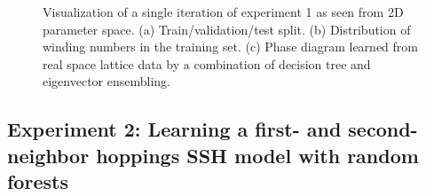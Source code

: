 \documentclass[fleqn,10pt]{wlscirep}
\begin{document}
\begin{figure}
\centering
{}\quad
{}
\caption{Visualization of a single iteration of experiment 1 as seen from 2D parameter space. (a) Train/validation/test split. (b) Distribution of winding numbers in the training set. (c) Phase diagram learned from real space lattice data by a combination of decision tree and eigenvector ensembling.}
\label{figexp1_exp}
\end{figure}

\subsection*{Experiment 2: Learning a first- and second-neighbor hoppings SSH model with random forests}
\label{exp2}
\end{document}
